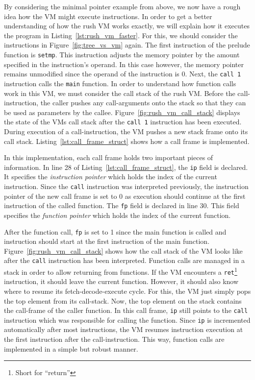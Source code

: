 By considering the minimal pointer example from above, we now have a rough idea how the VM might execute instructions.
In order to get a better understanding of how the rush VM works exactly, we will explain how it executes the program in Listing~\ref{lst:rush_vm_faster}.
For this, we should consider the instructions in Figure~\ref{fig:tree_vs_vm} again.
The first instruction of the prelude function is \texttt{setmp}.
This instruction adjusts the memory pointer by the amount specified in the instruction's operand.
In this case however, the memory pointer remains unmodified since the operand of the instruction is 0.
Next, the \texttt{call 1} instruction calls the \texttt{main} function.
In order to understand how function calls work in this VM, we must consider the call stack of the rush VM\@.
Before the call-instruction, the caller pushes any call-arguments onto the stack so that they can be used as parameters by the callee.
Figure~\ref{fig:rush_vm_call_stack} displays the state of the VMs call stack after the \texttt{call 1} instruction has been executed.
During execution of a call-instruction, the VM pushes a new stack frame onto its call stack.
Listing~\ref{lst:call_frame_struct} shows how a call frame is implemented.


In this implementation, each call frame holds two important pieces of information.
In line 28 of Listing~\ref{lst:call_frame_struct}, the \texttt{ip} field is declared.
It specifies the \emph{instruction pointer} which holds the index of the current instruction.
Since the \texttt{call} instruction was interpreted previously, the instruction pointer of the new call frame is set to 0 as execution should continue at the first instruction of the called function.
The \texttt{fp} field is declared in line 30.
This field specifies the \emph{function pointer} which holds the index of the current function.

After the function call, \texttt{fp} is set to 1 since the main function is called and instruction should start at the first instruction of the main function.
Figure~\ref{fig:rush_vm_call_stack} shows how the call stack of the VM looks like after the \texttt{call} instruction has been interpreted.
Function calls are managed in a stack in order to allow returning from functions.
If the VM encounters a \texttt{ret}\footnote{Short for \enquote{return}} instruction, it should leave the current function.
However, it should also know where to resume its fetch-decode-execute cycle.
For this, the VM just simply pops the top element from its call-stack.
Now, the top element on the stack contains the call-frame of the caller function.
In this call frame, \texttt{ip} still points to the \texttt{call} instruction which was responsible for calling the function.
Since \texttt{ip} is incremented automatically after most instructions, the VM resumes instruction execution at the first instruction after the call-instruction.
This way, function calls are implemented in a simple but robust manner.

